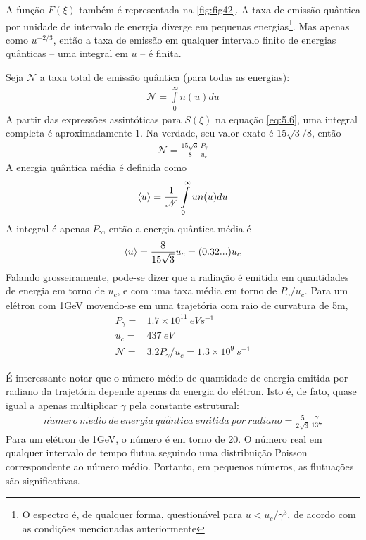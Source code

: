 A função $F(\xi)$ também é representada na \autoref{fig:fig42}. A taxa de emissão quântica por unidade de intervalo de energia diverge em pequenas energias\footnote{O espectro é, de qualquer forma, questionável para $u<u_c/\gamma^3$, de acordo com as condições mencionadas anteriormente}. Mas apenas como $u^{-2/3}$, então a taxa de emissão em qualquer intervalo finito de energias quânticas -- uma integral em $u$ -- é finita.

Seja $\mathscr{N}$ a taxa total de emissão quântica (para todas as energias):
\begin{align}
	\mathscr{N} = \int\limits_{0}^{\infty}n(u)du
\end{align}
A partir das expressões assintóticas para $S(\xi)$ na equação \eqref{eq:5.6}, uma integral completa é aproximadamente 1. Na verdade, seu valor exato é $15\sqrt{3}/8$, então
\begin{align}
	\mathscr{N} = \frac{15\sqrt{3}}{8}\frac{P_\gamma}{u_c}\label{eq:5.12}
\end{align}
A energia quântica média é definida como
\begin{align}
	\left< u \right> = \frac{1}{\mathscr{N}}\int\limits_{0}^{\infty}un(u)du
\end{align}
A integral é apenas $P_\gamma$, então a energia quântica média é
\begin{align}
	\left< u \right> = \frac{8}{15\sqrt{3}}u_c = (0.32...)u_c
\end{align}
Falando grosseiramente, pode-se dizer que a radiação é emitida em quantidades de energia em torno de $u_c$, e com uma taxa média em torno de $P_\gamma/u_c$. Para um elétron com 1GeV movendo-se em uma trajetória com raio de curvatura de 5m,
\begin{align*}
	P_\gamma =& 1.7 \times 10^11\ eVs^{-1}\\
	u_c =& 437\ eV\\
	\mathscr{N} =& 3.2 P_\gamma/u_c = 1.3 \times 10^9\ s^{-1}
\end{align*}

É interessante notar que o número médio de quantidade de energia emitida por radiano da trajetória depende apenas da energia do elétron. Isto é, de fato, quase igual a apenas multiplicar $\gamma$ pela constante estrutural:
\begin{align}
	n\acute{u}mero\ m\acute{e}dio\ de\ energia\ qu\hat{a}ntica\ emitida\ por\ radiano = \frac{5}{2\sqrt{3}}\frac{\gamma}{137}
\end{align}
Para um elétron de 1GeV, o número é em torno de 20. O número real em qualquer intervalo de tempo flutua seguindo uma distribuição Poisson correspondente ao número médio. Portanto, em pequenos números, as flutuações são significativas.

